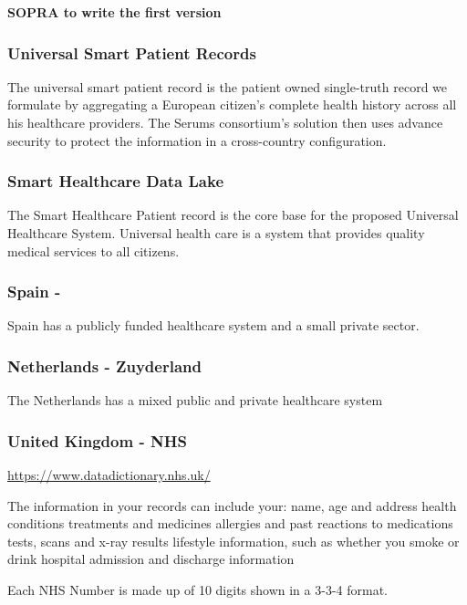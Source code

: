 
\textbf{SOPRA to write the first version}

\subsubsection{Universal Smart Patient Records}

\noindent
The universal smart patient record is the patient owned single-truth record we formulate by aggregating a European citizen's complete health history across all his healthcare providers. The Serums consortium's solution then uses advance security to protect the information in a cross-country configuration. 

\subsubsection{Smart Healthcare Data Lake}

The Smart Healthcare Patient record is the core base for the proposed Universal Healthcare System. Universal health care is a system that provides quality medical services to all citizens.

\subsubsection{Spain - }
Spain has a publicly funded healthcare system and a small private sector. 

\subsubsection{Netherlands - Zuyderland}

The Netherlands has a mixed public and private healthcare system

\subsubsection{United Kingdom - NHS}

\url{https://www.datadictionary.nhs.uk/}

The information in your records can include your:
name, age and address
health conditions
treatments and medicines
allergies and past reactions to medications
tests, scans and x-ray results
lifestyle information, such as whether you smoke or drink
hospital admission and discharge information

Each NHS Number is made up of 10 digits shown in a 3-3-4 format.

